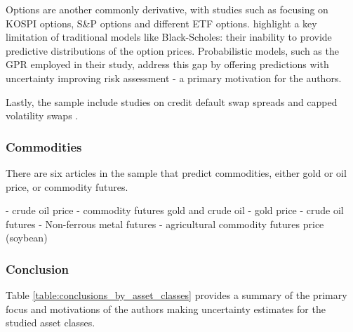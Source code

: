 Options are another commonly derivative, with studies such as \cite{Park2014gpr} focusing on KOSPI options, \cite{DeSpiegeleer2018gpr} S\&P options and \cite{tang2024period} different ETF options. \cite{Park2014gpr} highlight a key limitation of traditional models like Black-Scholes: their inability to provide predictive distributions of the option prices. Probabilistic models, such as the GPR employed in their study, address this gap by offering predictions with uncertainty improving risk assessment - a primary motivation for the authors. 

Lastly, the sample include studies on credit default swap spreads \parencite{Law2017Practical} and capped volatility swaps \parencite{Hocht2024gpr}. 


\subsubsection{Commodities}
There are six articles in the sample that predict commodities, either gold or oil price, or commodity futures. 









\cite{Ahmed2023Enhancing} - crude oil price
\cite{Law2017Practical} - commodity futures gold and crude oil
\cite{Wang2024GoldForecasting} - gold price
\cite{Guo2022Risk} - crude oil futures
\cite{Guo2022} - Non-ferrous metal futures
\cite{li2020multivariate} - agricultural commodity futures price (soybean)






\subsubsection{Conclusion} %
Table \ref{table:conclusions_by_asset_classes} provides a summary of the primary focus and motivations of the authors making uncertainty estimates for the studied asset classes.

